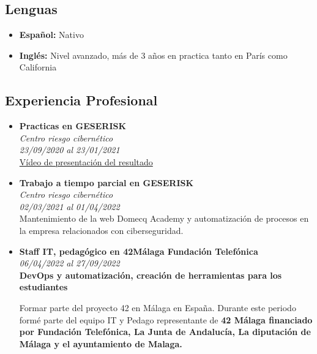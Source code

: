 \documentclass[11pt, oneside, a4paper, titlepage]{article}
\begin{document}
\begin{tcolorbox}
\begin{minipage}[t]{8cm}
\begin{tcolorbox}[grow to
			left by=0.6cm,colback=gray!25,colframe=white]
		\section*{Lenguas} 
			\begin{itemize}
				\item{\textbf{Español:} Nativo}
				\item{\textbf{Inglés:} Nivel avanzado, más de 3 años en practica tanto en París como California}
			\end{itemize}
		\end{tcolorbox} \end{minipage} 
		\begin{minipage}[t]{11cm}
		\vspace*{-0.5cm} 
			\begin{tcolorbox}[grow to right
		by=0.75cm,colframe=white,colback=white] 
				\section{Experiencia Profesional} 

			\begin{itemize} 
				\item { \textbf{Practicas en GESERISK} \\
				\emph{Centro riesgo cibernético} \\ \emph{23/09/2020 al
				23/01/2021} \\ 
				\href{https://youtu.be/AlB1oqxZPXA}{Vídeo de
				presentación del resultado}} 
				\item { \textbf{Trabajo a tiempo parcial en GESERISK} \\
				\emph{Centro riesgo cibernético} \\ \emph{02/03/2021 al
				01/04/2022} \\ Mantenimiento de la web Domecq Academy y
				automatización de procesos en la empresa relacionados con
				ciberseguridad. } \item { \textbf{Staff IT, pedagógico en
					42Málaga Fundación Telefónica} \\ \emph{06/04/2022 al
					27/09/2022} \\ \textbf{DevOps y automatización, creación de
					herramientas para los estudiantes}
					
					Formar parte del proyecto 42 en Málaga en España. Durante
					este periodo formé parte del equipo IT y Pedago
					representante de \textbf{42 Málaga financiado por Fundación
					Telefónica, La Junta de Andalucía, La diputación de Málaga y el
					ayuntamiento de Malaga.}
					
}
\end{itemize}
\end{tcolorbox}
\end{minipage}
\end{tcolorbox}
\end{document}
